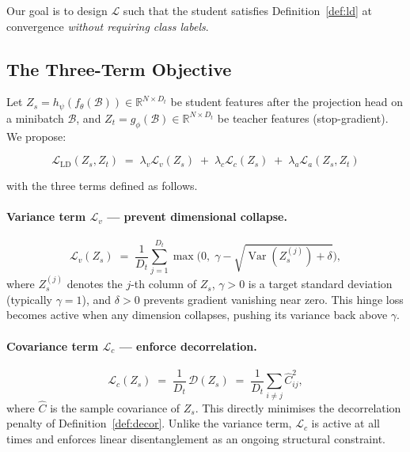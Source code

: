 \documentclass[11pt,a4paper]{article}
\newcommand{\R}{\mathbb{R}}
\newcommand{\calL}{\mathcal{L}}
\newcommand{\Var}{\operatorname{Var}}
\begin{document}
Our goal is to design $\calL$ such that the student satisfies
Definition~\ref{def:ld} at convergence \emph{without requiring class labels}.

\subsection{The Three-Term Objective}
\label{sec:loss}

Let $Z_s = h_\psi(f_\theta(\mathcal{B})) \in \R^{N \times D_t}$ be student
features after the projection head on a minibatch $\mathcal{B}$, and
$Z_t = g_\phi(\mathcal{B}) \in \R^{N \times D_t}$ be teacher features
(stop-gradient).  We propose:

\begin{equation}
\boxed{
    \calL_{\mathrm{LD}}(Z_s, Z_t)
    \;=\; \lambda_v \calL_v(Z_s)
    \;+\; \lambda_c \calL_c(Z_s)
    \;+\; \lambda_a \calL_a(Z_s, Z_t)
}
\label{eq:total_loss}
\end{equation}

with the three terms defined as follows.

\paragraph{Variance term $\calL_v$ — prevent dimensional collapse.}
\begin{equation}
    \calL_v(Z_s) \;=\; \frac{1}{D_t}\sum_{j=1}^{D_t}
    \max\!\bigl(0,\; \gamma - \sqrt{\Var(Z_s^{(j)}) + \delta}\bigr),
\label{eq:var_loss}
\end{equation}
where $Z_s^{(j)}$ denotes the $j$-th column of $Z_s$, $\gamma > 0$ is a
target standard deviation (typically $\gamma = 1$), and $\delta > 0$ prevents
gradient vanishing near zero.  This hinge loss becomes active when any
dimension collapses, pushing its variance back above $\gamma$.

\paragraph{Covariance term $\calL_c$ — enforce decorrelation.}
\begin{equation}
    \calL_c(Z_s) \;=\; \frac{1}{D_t}\, \mathcal{D}(Z_s)
    \;=\; \frac{1}{D_t}\sum_{i \ne j} \hat{C}_{ij}^2,
\label{eq:cov_loss}
\end{equation}
where $\hat{C}$ is the sample covariance of $Z_s$.  This directly minimises the
decorrelation penalty of Definition~\ref{def:decor}.  Unlike the variance term,
$\calL_c$ is active at all times and enforces linear disentanglement as an
ongoing structural constraint.
\end{document}

